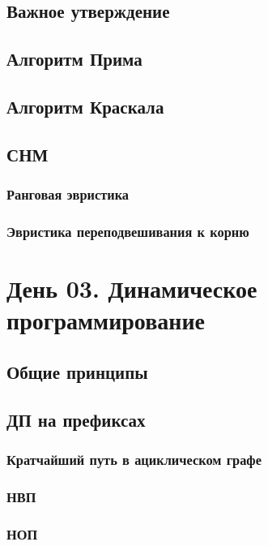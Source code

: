 \documentclass[a4paper,12pt]{article}
\begin{document}
    \subsection{Важное утверждение}

    \subsection{Алгоритм Прима}

    \subsection{Алгоритм Краскала}

    \subsection{СНМ}
      \subsubsection{Ранговая эвристика}
      \subsubsection{Эвристика переподвешивания к корню}

  \newpage

   \section{День 03. Динамическое программирование}

      \subsection{Общие принципы}

      \subsection{ДП на префиксах}
        \subsubsection{Кратчайший путь в ациклическом графе}
        \subsubsection{НВП}
        \subsubsection{НОП}
\end{document}
